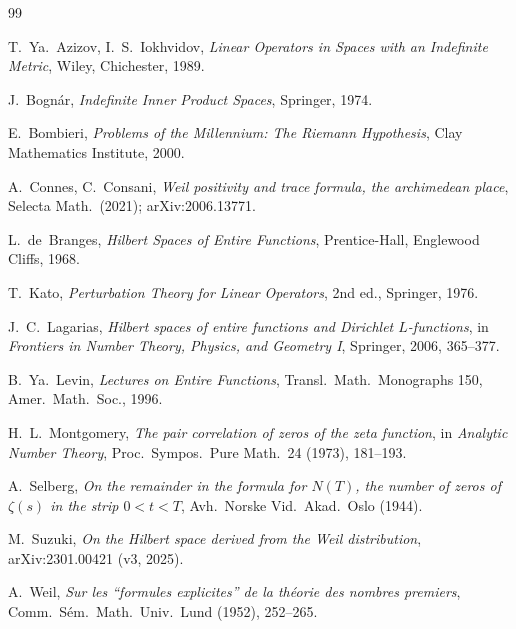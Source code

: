 \documentclass[11pt]{amsart}
\theoremstyle{definition}
\theoremstyle{remark}
\begin{document}
\begin{thebibliography}{99}

 T.~Ya.~Azizov, I.~S.~Iokhvidov, \emph{Linear Operators in
Spaces with an Indefinite Metric}, Wiley, Chichester, 1989.

 J.~Bogn\'ar, \emph{Indefinite Inner Product Spaces}, Springer, 1974.

 E.~Bombieri, \emph{Problems of the Millennium: The Riemann Hypothesis},
Clay Mathematics Institute, 2000.

 A.~Connes, C.~Consani, \emph{Weil positivity and trace formula,
the archimedean place}, Selecta Math.\ (2021); arXiv:2006.13771.

 L.~de~Branges, \emph{Hilbert Spaces of Entire Functions},
Prentice-Hall, Englewood Cliffs, 1968.

 T.~Kato, \emph{Perturbation Theory for Linear Operators}, 2nd ed.,
Springer, 1976.

 J.~C.~Lagarias, \emph{Hilbert spaces of entire functions and Dirichlet
$L$-functions}, in \emph{Frontiers in Number Theory, Physics, and Geometry I}, Springer,
2006, 365--377.

 B.~Ya.~Levin, \emph{Lectures on Entire Functions}, Transl.\ Math.\
Monographs 150, Amer.\ Math.\ Soc., 1996.

 H.~L.~Montgomery, \emph{The pair correlation of zeros of the zeta
function}, in \emph{Analytic Number Theory}, Proc.\ Sympos.\ Pure Math.\ 24 (1973),
181--193.

 A.~Selberg, \emph{On the remainder in the formula for $N(T)$, the number
of zeros of $\zeta(s)$ in the strip $0<t<T$}, Avh.\ Norske Vid.\ Akad.\ Oslo (1944).

 M.~Suzuki, \emph{On the Hilbert space derived from the Weil
distribution}, arXiv:2301.00421 (v3, 2025).

 A.~Weil, \emph{Sur les ``formules explicites'' de la th\'eorie des
nombres premiers}, Comm.\ S\'em.\ Math.\ Univ.\ Lund (1952), 252--265.

\end{thebibliography}
\end{document}
